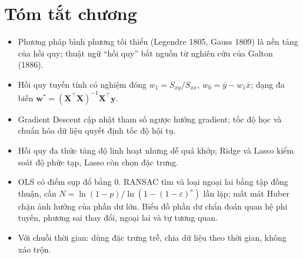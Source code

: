\section{Tóm tắt chương}
\begin{itemize}
    \item Phương pháp bình phương tối thiểu (Legendre 1805, Gauss 1809) là nền tảng của hồi quy; thuật ngữ ``hồi quy'' bắt nguồn từ nghiên cứu của Galton (1886).
    \item Hồi quy tuyến tính có nghiệm đóng $w_1 = S_{xy}/S_{xx}$, $w_0 = \bar{y} - w_1\bar{x}$; dạng đa biến $\mathbf{w}^* = (\mathbf{X}^\top\mathbf{X})^{-1}\mathbf{X}^\top\mathbf{y}$.
    \item Gradient Descent cập nhật tham số ngược hướng gradient; tốc độ học và chuẩn hóa dữ liệu quyết định tốc độ hội tụ.
    \item Hồi quy đa thức tăng độ linh hoạt nhưng dễ quá khớp; Ridge và Lasso kiểm soát độ phức tạp, Lasso còn chọn đặc trưng.
    \item OLS có điểm sụp đổ bằng 0. RANSAC tìm và loại ngoại lai bằng tập đồng thuận, cần $N = \ln(1 - p)/\ln(1 - (1 - \varepsilon)^s)$ lần lặp; mất mát Huber chặn ảnh hưởng của phần dư lớn. Biểu đồ phần dư chẩn đoán quan hệ phi tuyến, phương sai thay đổi, ngoại lai và tự tương quan.
    \item Với chuỗi thời gian: dùng đặc trưng trễ, chia dữ liệu theo thời gian, không xáo trộn.
\end{itemize}

